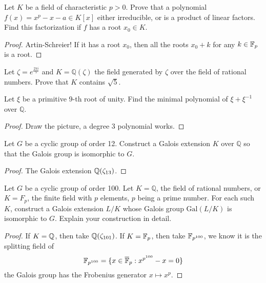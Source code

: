 \begin{prob}[S2015-Q1]
    Let \(K\) be a field of characteristic \(p>0\). Prove that a polynomial \(f(x)=x^{p}-x-a\in K[x]\) either irreducible, or is a product of linear factors. Find this factorization if \(f\) has a root \(x_{0}\in K\).
\end{prob}
\begin{proof}
    Artin-Schreier! If it has a root $x_0$, then all the roots $x_0+k$ for any $k\in\mathbb{F}_p$ is a root. 
\end{proof}


\begin{prob}[S2002-Q5]
    Let \(\zeta = e^{\frac{2\pi i}{5}}\) and \(K = \mathbb{Q}(\zeta)\) the field generated by \(\zeta\) over the field of rational numbers. Prove that \(K\) contains \(\sqrt{5}\).
\end{prob}



\begin{prob}[S2008-Q2]
    Let \(\xi\) be a primitive 9-th root of unity. Find the minimal polynomial of \(\xi + \xi^{-1}\) over \(\mathbb{Q}\).
\end{prob}
\begin{proof}
    Draw the picture, a degree $3$ polynomial works.
\end{proof}

\begin{prob}[F2007-Q1]
    Let \(G\) be a cyclic group of order 12. Construct a Galois extension \(K\) over \(\mathbb{Q}\) so that the Galois group is isomorphic to \(G\).
\end{prob}
\begin{proof}
    The Galois extension $\mathbb{Q}(\zeta_{13})$.
\end{proof}


\begin{prob}[F2011-Q3]
    Let \(G\) be a cyclic group of order 100. Let \(K=\mathbb{Q}\), the field of rational numbers, or \(K=F_p\), the finite field with \(p\) elements, \(p\) being a prime number. For each such \(K\), construct a Galois extension \(L/K\) whose Galois group \(\text{Gal}(L/K)\) is isomorphic to \(G\). Explain your construction in detail.
\end{prob}
\begin{proof}
    If $K=\mathbb{Q}$, then take $\mathbb{Q}(\zeta_{101})$. If $K=\mathbb{F}_p$, then take $\mathbb{F}_{p^{100}}$, we know it is the splitting field of 
    \begin{equation*}
        \mathbb{F}_{p^{100}}=\{x\in\overline{\mathbb{F}}_p: x^{p^{100}}-x=0\}
    \end{equation*}
    the Galois group has the Frobenius generator $x\mapsto x^{p}$.
\end{proof}

